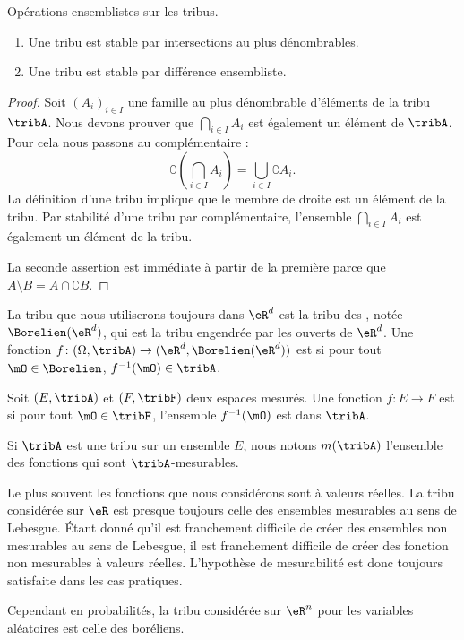 \begin{lemma}   \label{LemBWNlKfA}
    Opérations ensemblistes sur les tribus.
    \begin{enumerate}
        \item
    Une tribu est stable par intersections au plus dénombrables.
\item
    Une tribu est stable par différence ensembliste.
    \end{enumerate}
\end{lemma}

\begin{proof}
    Soit \( (A_i)_{i\in I}\) une famille au plus dénombrable d'éléments de la tribu \( \tribA\). Nous devons prouver que \( \bigcap_{i\in I}A_i\) est également un élément de \( \tribA\). Pour cela nous passons au complémentaire :
    \begin{equation}
        \complement\left( \bigcap_{i\in I}A_i \right)=\bigcup_{i\in I}\complement A_i.
    \end{equation}
    La définition d'une tribu implique que le membre de droite est un élément de la tribu. Par stabilité d'une tribu par complémentaire, l'ensemble \( \bigcap_{i\in I}A_i\) est également un élément de la tribu.

    La seconde assertion est immédiate à partir de la première parce que \( A\setminus B=A\cap \complement B\).
\end{proof}

La tribu que nous utiliserons toujours dans \( \eR^d\) est la tribu des , notée \( \Borelien(\eR^d)\), qui est la tribu engendrée par les ouverts de \( \eR^d\). Une fonction \( f\colon (\Omega,\tribA)\to (\eR^d,\Borelien(\eR^d))\) est  si pour tout \( \mO\in\Borelien\), \( f^{-1}(\mO)\in\tribA\).

\begin{definition}
    Soit \( (E,\tribA)\) et \( (F,\tribF)\) deux espaces mesurés. Une fonction \( f\colon E\to F\) est  si pour tout \( \mO\in \tribF\), l'ensemble \( f^{-1}(\mO)\) est dans \( \tribA\).
\end{definition}
Si \( \tribA\) est une tribu sur un ensemble \( E\), nous notons \( m(\tribA)\) l'ensemble des fonctions qui sont \( \tribA\)-mesurables.

\begin{remark}
    Le plus souvent les fonctions que nous considérons sont à valeurs réelles. La tribu considérée sur \( \eR\) est presque toujours celle des ensembles mesurables au sens de Lebesgue. Étant donné qu'il est franchement difficile de créer des ensembles non mesurables au sens de Lebesgue, il est franchement difficile de créer des fonction non mesurables à valeurs réelles. L'hypothèse de mesurabilité est donc toujours satisfaite dans les cas pratiques.

    Cependant en probabilités, la tribu considérée sur \( \eR^n\) pour les variables aléatoires est celle des boréliens.
\end{remark}

